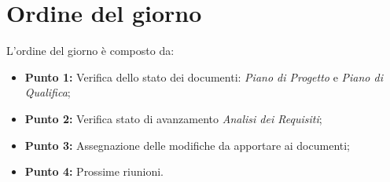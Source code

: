 \section{Ordine del giorno}
L'ordine del giorno è composto da: 
\begin{itemize}
	\item \textbf{Punto 1:} Verifica dello stato dei documenti: \textit{Piano di Progetto} e \textit{Piano di Qualifica};
	\item \textbf{Punto 2:} Verifica stato di avanzamento \textit{Analisi dei Requisiti};
	\item \textbf{Punto 3:} Assegnazione delle modifiche da apportare ai documenti;
	\item \textbf{Punto 4:} Prossime riunioni.
\end{itemize}
